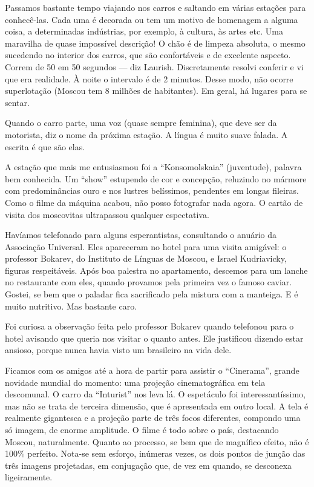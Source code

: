 Passamos bastante tempo viajando nos carros e saltando em várias estações para conhecê-las. Cada uma é decorada ou tem um motivo de homenagem a alguma coisa, a determinadas indústrias, por exemplo, à cultura, às artes etc. Uma maravilha de quase impossível descrição! O chão é de limpeza absoluta, o mesmo sucedendo no interior dos carros, que são confortáveis e de excelente aspecto. Correm de 50 em 50 segundos --- diz Laurish. Discretamente resolvi conferir e vi que era realidade. À noite o intervalo é de 2 minutos. Desse modo, não ocorre superlotação (Moscou tem 8 milhões de habitantes). Em geral, há lugares para se sentar.

Quando o carro parte, uma voz (quase sempre feminina), que deve ser da motorista, diz o nome da próxima estação. A língua é muito suave falada. A escrita é que são elas.

A estação que mais me entusiasmou foi a ``Konsomolskaia'' (juventude), palavra bem conhecida. Um ``show'' estupendo de cor e concepção, reluzindo no mármore com predominâncias ouro e nos lustres belíssimos, pendentes em longas fileiras. Como o filme da máquina acabou, não posso fotografar nada agora. O cartão de visita dos moscovitas ultrapassou qualquer espectativa.

Havíamos telefonado para alguns esperantistas, consultando o anuário da Associação Universal. Eles apareceram no hotel para uma visita amigável: o professor Bokarev, do Instituto de Línguas de Moscou, e Israel Kudriavicky, figuras respeitáveis. Após boa palestra no apartamento, descemos para um lanche no restaurante com eles, quando provamos pela primeira vez o famoso caviar. Gostei, se bem que o paladar fica sacrificado pela mistura com a manteiga. E é muito nutritivo. Mas bastante caro.

Foi curiosa a observação feita pelo professor Bokarev quando telefonou para o hotel avisando que queria nos visitar o quanto antes. Ele justificou dizendo estar ansioso, porque nunca havia visto um brasileiro na vida dele.

Ficamos com os amigos até a hora de partir para assistir o ``Cinerama'', grande novidade mundial do momento: uma projeção cinematográfica em tela descomunal. O carro da ``Inturist'' nos leva lá. O espetáculo foi interessantíssimo, mas não se trata de terceira dimensão, que é apresentada em outro local. A tela é realmente gigantesca e a projeção parte de três focos diferentes, compondo uma só imagem, de enorme amplitude. O filme é todo sobre o país, destacando Moscou, naturalmente. Quanto ao processo, se bem que de magnífico efeito, não é 100\% perfeito. Nota-se sem esforço, inúmeras vezes, os dois pontos de junção das três imagens projetadas, em conjugação que, de vez em quando, se desconexa ligeiramente.

